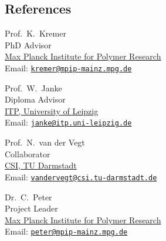\documentclass{article}
\begin{document}
\subsection*{References}

\begin{minipage}{0.45\linewidth}
Prof.\ K.\ Kremer
\vspace{-2mm}\\
{\tiny PhD Advisor}\\
\href{http://www.mpip-mainz.mpg.de}{Max Planck Institute for Polymer Research} \\
Email: \href{mailto:kremer@mpip-mainz.mpg.de}{\tt kremer@mpip-mainz.mpg.de}
\end{minipage}
\begin{minipage}{0.45\linewidth}
Prof.\ W.\ Janke
\vspace{-2mm}\\
{\tiny Diploma Advisor}\\
\href{http://www.physik.uni-leipzig.de/~janke/}{ITP, University of Leipzig} \\
Email: \href{mailto:janke@itp.uni-leipzig.de}{\tt janke@itp.uni-leipzig.de}
\end{minipage}

\vspace{2ex}
\begin{minipage}{0.45\linewidth}
Prof.\ N.\ van der Vegt
\vspace{-2mm}\\
{\tiny Collaborator}\\
\href{http://csi.tu-darmstadt.de}{CSI, TU Darmstadt} \\
Email: \href{mailto:vandervegt@csi.tu-darmstadt.de}{\tt vandervegt@csi.tu-darmstadt.de}
\end{minipage}
\begin{minipage}{0.45\linewidth}
Dr.\ C.\ Peter
\vspace{-2mm}\\
{\tiny Project Leader}\\
\href{http://www.mpip-mainz.mpg.de}{Max Planck Institute for Polymer Research} \\
Email: \href{mailto:peter@mpip-mainz.mpg.de}{\tt peter@mpip-mainz.mpg.de}
\end{minipage}
\end{document}

